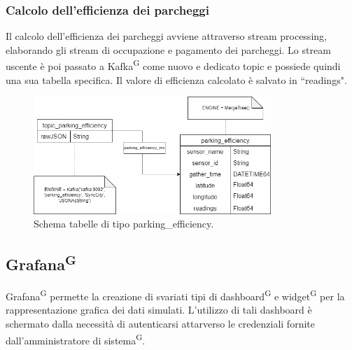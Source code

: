 \documentclass[8pt]{article}
\newcommand{\glossterm}[1]{#1\textsuperscript{G}} %
\begin{document}
\subsubsection{Calcolo dell'efficienza dei parcheggi}
Il calcolo dell'efficienza dei parcheggi avviene attraverso stream processing, elaborando gli stream di occupazione e pagamento dei parcheggi. Lo stream uscente è poi passato a \glossterm{Kafka} come nuovo e dedicato topic e possiede quindi una sua tabella specifica. Il valore di efficienza calcolato è salvato in ``readings".
\begin{figure}[h!]
    \centering
    \includegraphics[width=0.8\textwidth]{images_st/tabelle_parking_efficiency.png}
    \caption{Schema tabelle di tipo parking\_efficiency.}
    \label{fig:Schema tabelle di tipo parking_efficiency}
\end{figure}
\subsection{\glossterm{Grafana}}
\glossterm{Grafana} permette la creazione di svariati tipi di \glossterm{dashboard} e \glossterm{widget} per la rappresentazione grafica dei dati simulati. L'utilizzo di tali dashboard è schermato dalla necessità di autenticarsi attarverso le credenziali fornite dall'amministratore di \glossterm{sistema}.
\end{document}
